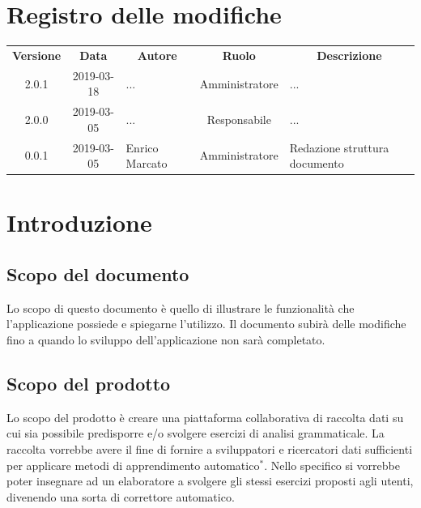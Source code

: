 \documentclass[11pt,a4paper]{article}
\begin{document}
	
	
	{\def\arraystretch{2}\tabcolsep=10pt
	\newpage
	\section*{\centering Registro delle modifiche}
	\begin{tabularx}{\textwidth}{ c | c | p{3.80cm} | c | X }
		\rowcolor{LightBlue}
		\color{white}\bfseries Versione & \color{white}\bfseries Data & \multicolumn{1}{c}{\color{white}\bfseries Autore}
		& \color{white}\bfseries Ruolo & \multicolumn{1}{c}{\color{white}\bfseries Descrizione}\\[0.25cm]
		2.0.1 & 2019-03-18 & ... & Amministratore & ... \\ \hline
		2.0.0 & 2019-03-05 & ... & Responsabile & ... \\ \hline
		0.0.1 & 2019-03-05 & Enrico Marcato & Amministratore & Redazione struttura documento \\ 
	 \hline		
	\end{tabularx}
	
	\newpage	
	
	\renewcommand  \contentsname {\Large Indice} 
	
	\tableofcontents
	\newpage
	\listoffigures
	\lstlistoflistings
	\newpage
	
	\section{Introduzione}
	\subsection{Scopo del documento}
	Lo scopo di questo documento è quello di illustrare le funzionalità che l'applicazione possiede e spiegarne l'utilizzo. Il documento subirà delle modifiche fino a quando lo sviluppo dell'applicazione non sarà completato.
	\subsection{Scopo del prodotto}
	Lo scopo del prodotto è creare una piattaforma collaborativa di raccolta dati su cui sia possibile predisporre e/o svolgere esercizi di analisi grammaticale. La raccolta vorrebbe avere il fine di fornire a sviluppatori e ricercatori dati sufficienti per applicare metodi di apprendimento automatico$^*$. Nello specifico si vorrebbe poter insegnare ad un elaboratore a svolgere gli stessi esercizi proposti agli utenti, divenendo una sorta di correttore automatico.
	
}
\end{document}
